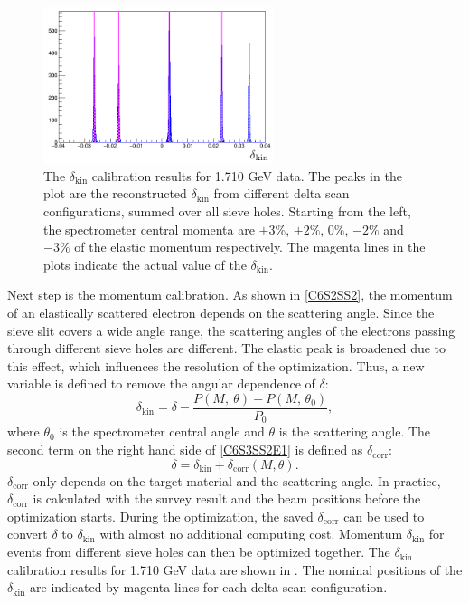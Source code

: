 \begin{figure}[tb!]
  \centering
  \includegraphics[width=0.6\textwidth]{figs/delta-pattern.png}
  \caption[The $\delta_{\mathrm{kin}}$ calibration results for 1.710 GeV data.]{The $\delta_{\mathrm{kin}}$ calibration results for 1.710 GeV data. The peaks in the plot are the reconstructed $\delta_{\mathrm{kin}}$ from different delta scan configurations, summed over all sieve holes. Starting from the left, the spectrometer central momenta are $+3\%$, $+2\%$, $0\%$, $-2\%$ and $-3\%$ of the elastic momentum respectively. The magenta lines in the plots indicate the actual value of the $\delta_{\mathrm{kin}}$. \label{C6S3SS2F4}}
\end{figure}

Next step is the momentum calibration. As shown in \cref{C6S2SS2}, the momentum of an elastically scattered electron depends on the scattering angle. Since the sieve slit covers a wide angle range, the scattering angles of the electrons passing through different sieve holes are different. The elastic peak is broadened due to this effect, which influences the resolution of the optimization. Thus, a new variable is defined to remove the angular dependence of $\delta$:
\begin{equation} \label{C6S3SS2E1}
\delta_{\mathrm{kin}} = \delta - \frac{P(M,\ \theta)-P(M,\, \theta_0)}{P_0},
\end{equation}
where $\theta_0$ is the spectrometer central angle and $\theta$ is the scattering angle. The second term on the right hand side of \cref{C6S3SS2E1} is defined as $\delta_{\mathrm{corr}}$:
\begin{equation} \label{C6S3SS2E2}
\delta = \delta_{\mathrm{kin}} + \delta_{\mathrm{corr}}(M, \theta).
\end{equation}
$\delta_{\mathrm{corr}}$ only depends on the target material and the scattering angle. In practice, $\delta_{\mathrm{corr}}$ is calculated with the survey result and the beam positions before the optimization starts. During the optimization, the saved $\delta_{\mathrm{corr}}$ can be used to convert $\delta$ to $\delta_{\mathrm{kin}}$ with almost no additional computing cost. Momentum $\delta_{\mathrm{kin}}$ for events from different sieve holes can then be optimized together. The $\delta_{\mathrm{kin}}$ calibration results for 1.710 GeV data are shown in . The nominal positions of the $\delta_{\mathrm{kin}}$ are indicated by magenta lines for each delta scan configuration.

